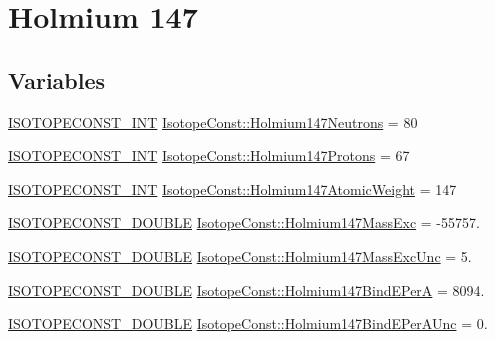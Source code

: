 \hypertarget{group___isotope_const-_holmium-_ho147}{}\section{Holmium 147}
\label{group___isotope_const-_holmium-_ho147}
\subsection*{Variables}
\begin{DoxyCompactItemize}
\item 
\mbox{\hyperlink{group___isotope_const-_macros_ga5f18360b3e99483a35c32d789e62621c}{I\+S\+O\+T\+O\+P\+E\+C\+O\+N\+S\+T\+\_\+\+I\+NT}} \mbox{\hyperlink{group___isotope_const-_holmium-_ho147_ga40a30e41ace2ebe9cd568cae5c49c37b}{Isotope\+Const\+::\+Holmium147\+Neutrons}} = 80
\item 
\mbox{\hyperlink{group___isotope_const-_macros_ga5f18360b3e99483a35c32d789e62621c}{I\+S\+O\+T\+O\+P\+E\+C\+O\+N\+S\+T\+\_\+\+I\+NT}} \mbox{\hyperlink{group___isotope_const-_holmium-_ho147_ga9b701e30b1f14a1871ccde8a536b0438}{Isotope\+Const\+::\+Holmium147\+Protons}} = 67
\item 
\mbox{\hyperlink{group___isotope_const-_macros_ga5f18360b3e99483a35c32d789e62621c}{I\+S\+O\+T\+O\+P\+E\+C\+O\+N\+S\+T\+\_\+\+I\+NT}} \mbox{\hyperlink{group___isotope_const-_holmium-_ho147_ga3e50f5b40fea5463800a80c051cf5996}{Isotope\+Const\+::\+Holmium147\+Atomic\+Weight}} = 147
\item 
\mbox{\hyperlink{group___isotope_const-_macros_ga8f45a7272ce02c0b4c65c44636ed719a}{I\+S\+O\+T\+O\+P\+E\+C\+O\+N\+S\+T\+\_\+\+D\+O\+U\+B\+LE}} \mbox{\hyperlink{group___isotope_const-_holmium-_ho147_ga240926e541e003833dde549eef70f60c}{Isotope\+Const\+::\+Holmium147\+Mass\+Exc}} = -\/55757.
\item 
\mbox{\hyperlink{group___isotope_const-_macros_ga8f45a7272ce02c0b4c65c44636ed719a}{I\+S\+O\+T\+O\+P\+E\+C\+O\+N\+S\+T\+\_\+\+D\+O\+U\+B\+LE}} \mbox{\hyperlink{group___isotope_const-_holmium-_ho147_gaf49be4db8aa675a1004cf4bf979090de}{Isotope\+Const\+::\+Holmium147\+Mass\+Exc\+Unc}} = 5.
\item 
\mbox{\hyperlink{group___isotope_const-_macros_ga8f45a7272ce02c0b4c65c44636ed719a}{I\+S\+O\+T\+O\+P\+E\+C\+O\+N\+S\+T\+\_\+\+D\+O\+U\+B\+LE}} \mbox{\hyperlink{group___isotope_const-_holmium-_ho147_gac5e9944c917d30280b979589b6e78aec}{Isotope\+Const\+::\+Holmium147\+Bind\+E\+PerA}} = 8094.
\item 
\mbox{\hyperlink{group___isotope_const-_macros_ga8f45a7272ce02c0b4c65c44636ed719a}{I\+S\+O\+T\+O\+P\+E\+C\+O\+N\+S\+T\+\_\+\+D\+O\+U\+B\+LE}} \mbox{\hyperlink{group___isotope_const-_holmium-_ho147_ga907e1fd35b495ef08fce44eaa6b60a1e}{Isotope\+Const\+::\+Holmium147\+Bind\+E\+Per\+A\+Unc}} = 0.

\end{DoxyCompactItemize}
